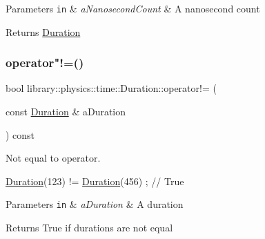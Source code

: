 \begin{DoxyParams}[1]{Parameters}
\mbox{\tt in}  & {\em a\+Nanosecond\+Count} & A nanosecond count \\
\hline
\end{DoxyParams}
\begin{DoxyReturn}{Returns}
\hyperlink{classlibrary_1_1physics_1_1time_1_1_duration}{Duration} 
\end{DoxyReturn}
\mbox{\label{classlibrary_1_1physics_1_1time_1_1_duration_a620feff807a95ea439fdfdd5cf5490b2}} 
\subsubsection{\texorpdfstring{operator"!=()}{operator!=()}}
{\footnotesize\ttfamily bool library\+::physics\+::time\+::\+Duration\+::operator!= (\begin{DoxyParamCaption}\item[{const \hyperlink{classlibrary_1_1physics_1_1time_1_1_duration}{Duration} \&}]{a\+Duration }\end{DoxyParamCaption}) const}



Not equal to operator. 


\begin{DoxyCode}
\hyperlink{classlibrary_1_1physics_1_1time_1_1_duration_a0a70efcf487a841da572afcf00001f64}{Duration}(123) != \hyperlink{classlibrary_1_1physics_1_1time_1_1_duration_a0a70efcf487a841da572afcf00001f64}{Duration}(456) ; \textcolor{comment}{// True}
\end{DoxyCode}



\begin{DoxyParams}[1]{Parameters}
\mbox{\tt in}  & {\em a\+Duration} & A duration \\
\hline
\end{DoxyParams}
\begin{DoxyReturn}{Returns}
True if durations are not equal 
\end{DoxyReturn}
\mbox{\label{classlibrary_1_1physics_1_1time_1_1_duration_a6aea6dbe11b3199e63ee29a851c3fc16}} 
